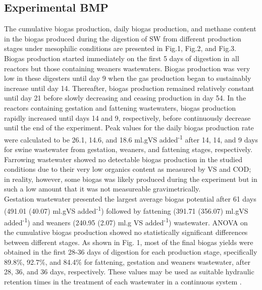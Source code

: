 \subsection{Experimental BMP}
The cumulative biogas production, daily biogas production, and methane content in the biogas produced during the digestion of SW from different production stages under mesophilic conditions are presented in Fig.1, Fig.2, and Fig.3.\\

Biogas production started immediately on the first 5 days of digestion in all reactors but those containing weaners wastewaters. Biogas production was very low in these digesters until day 9 when the gas production began to sustainably increase until day 14. Thereafter, biogas production remained relatively constant until day 21 before slowly decreasing and ceasing production in day 54. In the reactors containing gestation and fattening wastewaters, biogas production rapidly increased until days 14 and 9, respectively, before continuously decrease until the end of the experiment. Peak values for the daily biogas production rate were calculated to be 26.1, 14.6, and 18.6 ml.gVS added\textsuperscript{-1} after 14, 14, and 9 days for swine wastewater from gestation, weaners, and fattening stages, respectively.
Farrowing wastewater showed no detectable biogas production in the studied conditions due to their very low organics content as measured by VS and COD; in reality, however, some biogas was likely produced during the experiment but in such a low amount that it was not measureable gravimetrically.\\
Gestation wastewater presented the largest average biogas potential after 61 days (491.01 (40.07) ml.gVS added\textsuperscript{-1}) followed by fattening (391.71 (356.07) ml.gVS added\textsuperscript{-1}) and weaners (240.95 (2.07) ml.g VS added\textsuperscript{-1}) wastewater. ANOVA on the cumulative biogas production showed no statistically significant differences between different stages. As shown in Fig. 1, most of the final biogas yields were obtained in the first 28-36 days of digestion for each production stage, specifically 89.8\%, 92.7\%, and 84.4\% for fattening, gestation and weaners wastewater, after 28, 36, and 36 days, respectively. These values may be used as suitable hydraulic retention times in the treatment of each wastewater in a continuous system \cite{Li_2013}.

